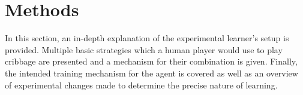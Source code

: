 \section{Methods}
\label{sec:dm}


In this section,
an in-depth explanation of the experimental learner's setup is provided.
%
Multiple basic strategies which a human player would use to play cribbage are
presented and a mechanism for their combination is given.
%
Finally,
the intended training mechanism for the agent is covered
as well as an overview of experimental changes made to determine the precise
nature of learning.



